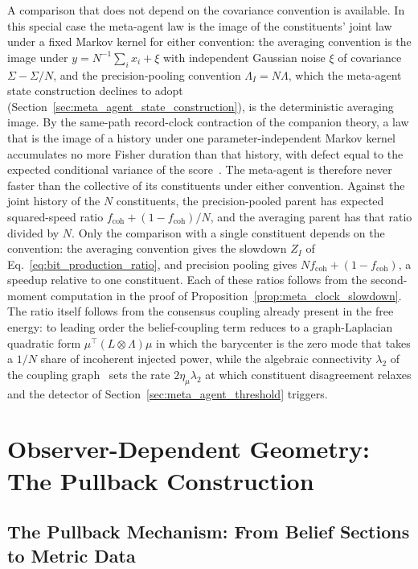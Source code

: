 A comparison that does not depend on the covariance convention is available. In this special case the meta-agent law is the image of the constituents' joint law under a fixed Markov kernel for either convention: the averaging convention is the image under $y = N^{-1}\sum_i x_i + \xi$ with independent Gaussian noise $\xi$ of covariance $\Sigma - \Sigma/N$, and the precision-pooling convention $\Lambda_I = N\Lambda$, which the meta-agent state construction declines to adopt (Section~\ref{sec:meta_agent_state_construction}), is the deterministic averaging image. By the same-path record-clock contraction of the companion theory, a law that is the image of a history under one parameter-independent Markov kernel accumulates no more Fisher duration than that history, with defect equal to the expected conditional variance of the score~\cite[Ch.~7]{DennisGaugeVFE2026}. The meta-agent is therefore never faster than the collective of its constituents under either convention. Against the joint history of the $N$ constituents, the precision-pooled parent has expected squared-speed ratio $f_{\mathrm{coh}} + (1 - f_{\mathrm{coh}})/N$, and the averaging parent has that ratio divided by $N$. Only the comparison with a single constituent depends on the convention: the averaging convention gives the slowdown $Z_I$ of Eq.~\eqref{eq:bit_production_ratio}, and precision pooling gives $N f_{\mathrm{coh}} + (1 - f_{\mathrm{coh}})$, a speedup relative to one constituent. Each of these ratios follows from the second-moment computation in the proof of Proposition~\ref{prop:meta_clock_slowdown}. The ratio itself follows from the consensus coupling already present in the free energy: to leading order the belief-coupling term reduces to a graph-Laplacian quadratic form $\mu^\top (L \otimes \Lambda)\mu$ in which the barycenter is the zero mode that takes a $1/N$ share of incoherent injected power, while the algebraic connectivity $\lambda_2$ of the coupling graph~\cite{Fiedler1973} sets the rate $2\eta_\mu\lambda_2$ at which constituent disagreement relaxes and the detector of Section~\ref{sec:meta_agent_threshold} triggers.

\section{Observer-Dependent Geometry: The Pullback Construction}\label{sec:it_from_bit}

\subsection{The Pullback Mechanism: From Belief Sections to Metric Data}
\label{sec:pullback}

